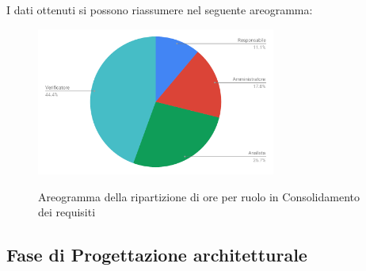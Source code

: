 \pagebreak
I dati ottenuti si possono riassumere nel seguente areogramma:
\begin{figure}[H] 
			\centering 
				\includegraphics[width=0.7\textwidth]{res/images/areogramma_consolidamento.pdf}\\
				\caption{Areogramma della ripartizione di ore per ruolo in Consolidamento dei requisiti}
			\label{AreogrammaConsolidaemnto}
\end{figure}

\subsection{Fase di Progettazione architetturale}
